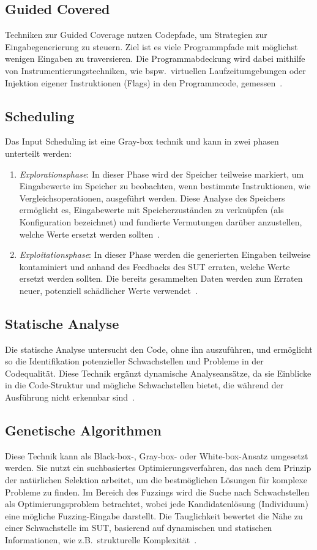 \subsection{Guided Covered}\label{subsec:guided-covered}
Techniken zur Guided Coverage nutzen Codepfade, um Strategien zur Eingabegenerierung zu
steuern.
Ziel ist es viele Programmpfade mit möglichst wenigen Eingaben zu traversieren.
Die Programmabdeckung wird dabei mithilfe von Instrumentierungstechniken, wie bspw.\ virtuellen Laufzeitumgebungen oder
Injektion eigener Instruktionen (Flags) in den Programmcode, gemessen~\cite{eceiza_fuzzing_2021}.
\subsection{Scheduling}\label{subsec:scheduling}
Das Input Scheduling ist eine Gray-box technik und kann in zwei phasen unterteilt werden:
\begin{enumerate}
    \item \textit{Explorationsphase}: In dieser Phase wird der Speicher teilweise markiert, um Eingabewerte im Speicher
    zu beobachten, wenn bestimmte Instruktionen, wie Vergleichsoperationen, ausgeführt werden.
    Diese Analyse des Speichers ermöglicht es, Eingabewerte mit Speicherzuständen zu verknüpfen (als Konfiguration bezeichnet)
    und fundierte Vermutungen darüber anzustellen, welche Werte ersetzt werden sollten~\cite{eceiza_fuzzing_2021}.
    \item \textit{Exploitationsphase}: In dieser Phase werden die generierten Eingaben teilweise kontaminiert und anhand des
    Feedbacks des SUT erraten, welche Werte ersetzt werden sollten.
    Die bereits gesammelten Daten werden zum Erraten neuer, potenziell schädlicher Werte verwendet~\cite{eceiza_fuzzing_2021}.
\end{enumerate}
\subsection{Statische Analyse}\label{subsec:statische-analyse}
Die statische Analyse untersucht den Code, ohne ihn auszuführen, und ermöglicht so die Identifikation potenzieller
Schwachstellen und Probleme in der Codequalität.
Diese Technik ergänzt dynamische Analyseansätze, da sie Einblicke in die Code-Struktur und mögliche Schwachstellen bietet,
die während der Ausführung nicht erkennbar sind~\cite{wang_systematic_2020}.
\subsection{Genetische Algorithmen}\label{subsec:genetische-algorithmen}
Diese Technik kann als Black-box-, Gray-box- oder White-box-Ansatz umgesetzt werden.
Sie nutzt ein suchbasiertes Optimierungsverfahren, das nach dem Prinzip der natürlichen Selektion arbeitet, um die
bestmöglichen Lösungen für komplexe Probleme zu finden.
Im Bereich des Fuzzings wird die Suche nach Schwachstellen als Optimierungsproblem betrachtet, wobei jede Kandidatenlösung
(Individuum) eine mögliche Fuzzing-Eingabe darstellt.
Die Tauglichkeit bewertet die Nähe zu einer Schwachstelle im SUT, basierend auf dynamischen und
statischen Informationen, wie z.B.\ strukturelle Komplexität~\cite{eceiza_fuzzing_2021}.
